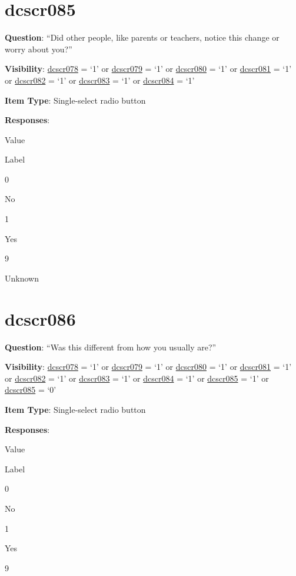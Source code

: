 \documentclass[]{book}
\begin{document}
\hypertarget{dcscr085}{%
\section{dcscr085}\label{dcscr085}}

\textbf{Question}: ``Did other people, like parents or teachers, notice this change or worry about you?''

\textbf{Visibility}: \protect\hyperlink{dcscr078}{dcscr078} = `1' or \protect\hyperlink{dcscr079}{dcscr079} = `1' or \protect\hyperlink{dcscr080}{dcscr080} = `1' or \protect\hyperlink{dcscr081}{dcscr081} = `1' or \protect\hyperlink{dcscr082}{dcscr082} = `1' or \protect\hyperlink{dcscr083}{dcscr083} = `1' or \protect\hyperlink{dcscr084}{dcscr084} = `1'

\textbf{Item Type}: Single-select radio button

\textbf{Responses}:

Value

Label

0

No

1

Yes

9

Unknown

\hypertarget{dcscr086}{%
\section{dcscr086}\label{dcscr086}}

\textbf{Question}: ``Was this different from how you usually are?''

\textbf{Visibility}: \protect\hyperlink{dcscr078}{dcscr078} = `1' or \protect\hyperlink{dcscr079}{dcscr079} = `1' or \protect\hyperlink{dcscr080}{dcscr080} = `1' or \protect\hyperlink{dcscr081}{dcscr081} = `1' or \protect\hyperlink{dcscr082}{dcscr082} = `1' or \protect\hyperlink{dcscr083}{dcscr083} = `1' or \protect\hyperlink{dcscr084}{dcscr084} = `1' or \protect\hyperlink{dcscr085}{dcscr085} = `1' or \protect\hyperlink{dcscr085}{dcscr085} = `0'

\textbf{Item Type}: Single-select radio button

\textbf{Responses}:

Value

Label

0

No

1

Yes

9
\end{document}
